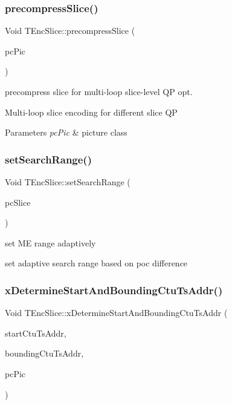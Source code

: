 \subsubsection{\texorpdfstring{precompress\+Slice()}{precompressSlice()}}
{\footnotesize\ttfamily Void T\+Enc\+Slice\+::precompress\+Slice (\begin{DoxyParamCaption}\item[{\hyperlink{class_t_com_pic}{T\+Com\+Pic} $\ast$}]{pc\+Pic }\end{DoxyParamCaption})}



precompress slice for multi-\/loop slice-\/level QP opt. 

Multi-\/loop slice encoding for different slice QP


\begin{DoxyParams}{Parameters}
{\em pc\+Pic} & picture class \\
\hline
\end{DoxyParams}
\mbox{\label{class_t_enc_slice_a40b64c2ccca74997abde6c6049158b13}} 
\subsubsection{\texorpdfstring{set\+Search\+Range()}{setSearchRange()}}
{\footnotesize\ttfamily Void T\+Enc\+Slice\+::set\+Search\+Range (\begin{DoxyParamCaption}\item[{\hyperlink{class_t_com_slice}{T\+Com\+Slice} $\ast$}]{pc\+Slice }\end{DoxyParamCaption})}



set ME range adaptively 

set adaptive search range based on poc difference \mbox{\label{class_t_enc_slice_aa0d1a1bbc6f94db1bd7f5bd13e1a7c82}} 
\subsubsection{\texorpdfstring{x\+Determine\+Start\+And\+Bounding\+Ctu\+Ts\+Addr()}{xDetermineStartAndBoundingCtuTsAddr()}}
{\footnotesize\ttfamily Void T\+Enc\+Slice\+::x\+Determine\+Start\+And\+Bounding\+Ctu\+Ts\+Addr (\begin{DoxyParamCaption}\item[{U\+Int \&}]{start\+Ctu\+Ts\+Addr,  }\item[{U\+Int \&}]{bounding\+Ctu\+Ts\+Addr,  }\item[{\hyperlink{class_t_com_pic}{T\+Com\+Pic} $\ast$}]{pc\+Pic }\end{DoxyParamCaption})}

